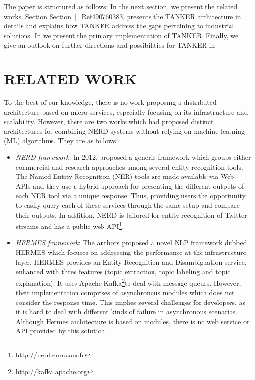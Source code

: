 \documentclass{sig-alternate}
\begin{document}
The paper is structured as follows: In the next section, we present the related works. Section Section~\ref{_Ref490760383} presents the TANKER architecture in details and explains how TANKER address the gaps pertaining to industrial solutions. In we present the primary implementation of TANKER. Finally, we give an outlook on further directions and possibilities for TANKER in 

\section{RELATED WORK}

To the best of our knowledge, there is no work proposing a distributed architecture based on micro-services, especially focusing on its infrastructure and scalability. However, there are two works which had proposed distinct architectures for combining NERD systems without relying on machine learning (ML) algorithms. They are as follows:
\begin{itemize}
\item {\em NERD framework}: In 2012, proposed a generic framework which groups either commercial and research approaches among several entity recognition tools. The Named Entity Recognition (NER) tools are made available via Web APIs and they use a hybrid approach for presenting the different outputs of each NER tool via a unique response. Thus, providing users the opportunity to easily query each of these services through the same setup and compare their outputs. In addition, NERD is tailored for entity recognition of Twitter streams and has a public web API\footnote{\url{http://nerd.eurocom.fr}}. 
\item {\em HERMES framework}: The authors proposed a novel NLP framework dubbed HERMES which focuses on addressing the performance at the infrastructure layer. HERMES provides an Entity Recognition and Disambiguation service, enhanced with three features (topic extraction, topic labeling and topic explanation). It uses Apache Kafka\footnote{\url{http://kafka.apache.org}}to deal with message queues. However, their implementation comprises of asynchronous modules which does not consider the response time. This implies several challenges for developers, as it is hard to deal with different kinds of failure in asynchronous scenarios. Although Hermes architecture is based on modules, there is no web service or API provided by this solution.
\end{itemize}
\end{document}
